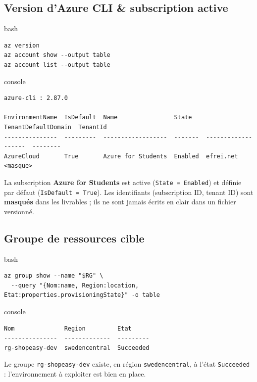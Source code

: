 \documentclass[11pt,a4paper]{article}
\newcommand{\code}[1]{\texttt{#1}}
\begin{document}
\subsection{Version d'Azure CLI \& subscription active}
\begin{codebox}{bash}
\begin{Verbatim}
az version
az account show --output table
az account list --output table
\end{Verbatim}
\end{codebox}
\begin{codebox}{console}
\begin{Verbatim}
azure-cli : 2.87.0

EnvironmentName  IsDefault  Name                State    TenantDefaultDomain  TenantId
---------------  ---------  ------------------  -------  -------------------  --------
AzureCloud       True       Azure for Students  Enabled  efrei.net            <masque>
\end{Verbatim}
\end{codebox}
La subscription \textbf{Azure for Students} est active (\code{State = Enabled}) et définie par défaut (\code{IsDefault = True}). Les identifiants (subscription ID, tenant ID) sont \textbf{masqués} dans les livrables ; ils ne sont jamais écrits en clair dans un fichier versionné.

\subsection{Groupe de ressources cible}
\begin{codebox}{bash}
\begin{Verbatim}
az group show --name "$RG" \
  --query "{Nom:name, Region:location, Etat:properties.provisioningState}" -o table
\end{Verbatim}
\end{codebox}
\begin{codebox}{console}
\begin{Verbatim}
Nom              Region         Etat
---------------  -------------  ---------
rg-shopeasy-dev  swedencentral  Succeeded
\end{Verbatim}
\end{codebox}
Le groupe \code{rg-shopeasy-dev} existe, en région \code{swedencentral}, à l'état \code{Succeeded} : l'environnement à exploiter est bien en place.
\end{document}

